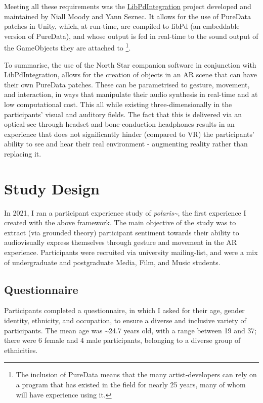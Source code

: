 Meeting all these requirements was the \href{https://github.com/LibPdIntegration/LibPdIntegration}{LibPdIntegration} project developed and maintained by Niall Moody and Yann Seznec. It allows for the use of PureData patches in Unity, which, at run-time, are compiled to libPd (an embeddable version of PureData), and whose output is fed in real-time to the sound output of the GameObjects they are attached to  \footnote{The inclusion of PureData means that the many artist-developers can rely on a program that has existed in the field for nearly 25 years, many of whom will have experience using it.}.

To summarise, the use of the North Star companion software in conjunction with LibPdIntegration, allows for the creation of objects in an AR scene that can have their own PureData patches. These can be parametrised to gesture, movement, and interaction, in ways that manipulate their audio synthesis in real-time and at low computational cost. This all while existing three-dimensionally in the participants’ visual and auditory fields. The fact that this is delivered via an optical-see through headset and bone-conduction headphones results in an experience that does not significantly hinder (compared to VR) the participants’ ability to see and hear their real environment - augmenting reality rather than replacing it.



\section{Study Design}\label{sec: polaris-study}
In 2021, I ran a participant experience study of \textit{polaris\textasciitilde{}}, the first experience I created with the above framework. The main objective of the study was to extract (via grounded theory) participant sentiment towards their ability to audiovisually express themselves through gesture and movement in the AR experience. Participants were recruited via university mailing-list, and were a mix of undergraduate and postgraduate Media, Film, and Music students.

\subsection{Questionnaire}\label{sec: polaris-study-questionnaire}
Participants completed a questionnaire, in which I asked for their age, gender identity, ethnicity, and occupation, to ensure a diverse and inclusive variety of participants. The mean age was \textasciitilde{}24.7 years old, with a range between 19 and 37; there were 6 female and 4 male participants, belonging to a diverse group of ethnicities.

